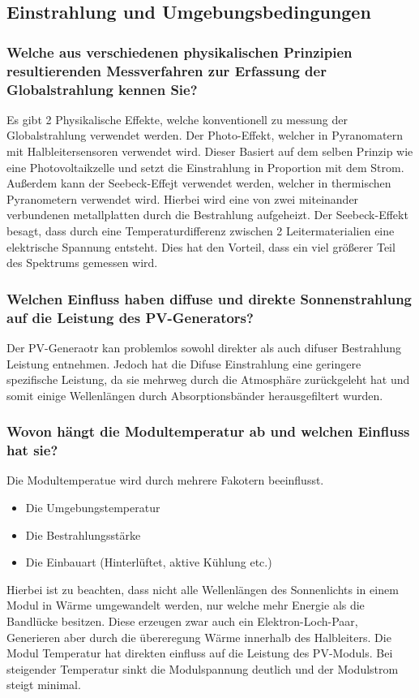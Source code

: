 \subsection{Einstrahlung und Umgebungsbedingungen}
\subsubsection{Welche aus verschiedenen physikalischen Prinzipien resultierenden Messverfahren zur Erfassung der Globalstrahlung kennen Sie?}
Es gibt 2 Physikalische Effekte, welche konventionell zu messung der Globalstrahlung verwendet werden. 
Der Photo-Effekt, welcher in Pyranomatern mit Halbleitersensoren verwendet wird. 
Dieser Basiert auf dem selben Prinzip wie eine Photovoltaikzelle und setzt die Einstrahlung in Proportion mit dem Strom.
Außerdem kann der Seebeck-Effejt verwendet werden, welcher in thermischen Pyranometern verwendet wird.
Hierbei wird eine von zwei miteinander verbundenen metallplatten durch die Bestrahlung aufgeheizt. 
Der Seebeck-Effekt besagt, dass durch eine Temperaturdifferenz zwischen 2 Leitermaterialien eine elektrische Spannung entsteht.\cite{Wiki-Seebeck}
Dies hat den Vorteil, dass ein viel größerer Teil des Spektrums gemessen wird.

\subsubsection{Welchen Einfluss haben diffuse und direkte Sonnenstrahlung auf die Leistung des PV-Generators?}
Der PV-Generaotr kan problemlos sowohl direkter als auch difuser Bestrahlung Leistung entnehmen. 
Jedoch hat die Difuse Einstrahlung eine geringere spezifische Leistung, da sie mehrweg durch die Atmosphäre zurückgeleht hat und somit einige Wellenlängen durch Absorptionsbänder herausgefiltert wurden.
\subsubsection{Wovon hängt die Modultemperatur ab und welchen Einfluss hat sie?}
Die Modultemperatue wird durch mehrere Fakotern beeinflusst.
\begin{itemize}
    \item Die Umgebungstemperatur
    \item Die Bestrahlungsstärke
    \item Die Einbauart (Hinterlüftet, aktive Kühlung etc.)
\end{itemize}
Hierbei ist zu beachten, dass nicht alle Wellenlängen des Sonnenlichts in einem Modul in Wärme umgewandelt werden, nur welche mehr Energie als die Bandlücke besitzen.
Diese erzeugen zwar auch ein Elektron-Loch-Paar, Generieren aber durch die übereregung Wärme innerhalb des Halbleiters.
Die Modul Temperatur hat direkten einfluss auf die Leistung des PV-Moduls.
Bei steigender Temperatur sinkt die Modulspannung deutlich und der Modulstrom steigt minimal.
